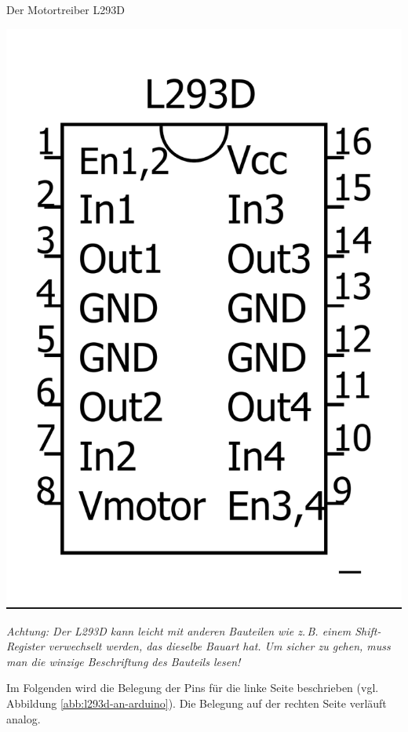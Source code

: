 \begin{zsfg}{Der Motortreiber L293D}
\begin{minipage}{0.28\textwidth}
\begin{minipage}{0.48\textwidth}
		\end{minipage}
		\hfill
		\begin{minipage}{0.48\textwidth}
			\centering
			\includegraphics[width=\textwidth]{./Zeichnungen/motortreiber-l293d.png}
		\end{minipage}
	\end{minipage}

	\medskip		
	\emph{Achtung: Der L293D kann leicht mit anderen Bauteilen wie z.\,B. einem Shift-Register verwechselt werden, das dieselbe Bauart hat. Um sicher zu gehen, muss man die winzige Beschriftung des Bauteils lesen!}
\end{zsfg}

Im Folgenden wird die Belegung der Pins für die linke Seite beschrieben (vgl. Abbildung \ref{abb:l293d-an-arduino}). Die Belegung auf der rechten Seite verläuft analog.

